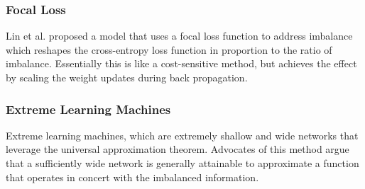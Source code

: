 \documentclass[journal]{IEEEtran}
\begin{document}
	\subsubsection{Focal Loss}
	Lin et al. proposed a model that uses a focal loss function to address imbalance which reshapes the cross-entropy loss function in proportion to the ratio of imbalance.
	Essentially this is like a cost-sensitive method, but achieves the effect by scaling the weight updates during back propagation.
	
	\subsubsection{Extreme Learning Machines}
	Extreme learning machines, which are extremely shallow and wide networks that leverage the universal approximation theorem.
	Advocates of this method argue that a sufficiently wide network is generally attainable to approximate a function that operates 
	in concert with the imbalanced information.
	
\end{document}
